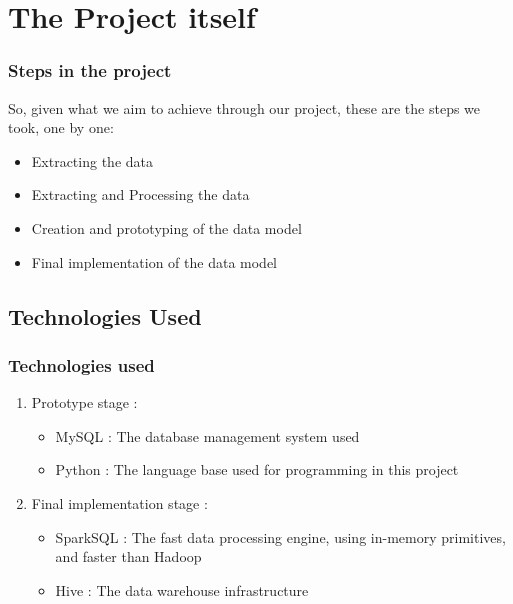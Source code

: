 \documentclass[12pt,xcolor=dvipsnames]{beamer}
\begin{document}
\section{The Project itself}
\begin{frame}[t]
\frametitle{Steps in the project}

\vfill
So, given what we aim to achieve through our project, these are the steps we took, one by one:

\begin{itemize}
\item Extracting the data
\item Extracting and Processing the data
\item Creation and prototyping of the data model
\item Final implementation of the data model
\end{itemize}

\end{frame}

\subsection{Technologies Used}
\begin{frame}[t]
\frametitle{Technologies used}

\vfill
\begin{enumerate}

\item Prototype stage :

\vfill
\begin{itemize}

\item MySQL		:	The database management system used\\

\item Python		:	The language base used for programming in this project

\end{itemize}

\vfill
\item Final implementation stage :

\vfill
\begin{itemize}

\item SparkSQL	:	The fast data processing engine, using in-memory primitives, and faster than Hadoop\\

\item Hive		:	The data warehouse infrastructure

\end{itemize}


\end{enumerate}

\end{frame}
\end{document}
